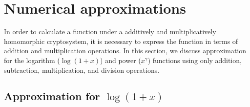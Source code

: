

\section{Numerical approximations}
In order to calculate a function under a additively and multiplicatively homomorphic cryptosystem, it is necessary to express the function in terms of addition and multiplication operations.
In this section, we discuss approximation for the logarithm ($\log(1+x)$) and power ($x^\gamma$) functions using only addition, subtraction, multiplication, and division operations.
\subsection{Approximation for $\log(1+x)$}

